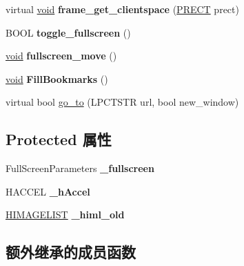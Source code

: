 \begin{DoxyCompactItemize}
\item 
\mbox{\label{struct_main_frame_base_ab834062a8833a75cfe588cfc1566be9c}} 
virtual \hyperlink{interfacevoid}{void} {\bfseries frame\+\_\+get\+\_\+clientspace} (\hyperlink{structtag_r_e_c_t}{P\+R\+E\+CT} prect)
\item 
\mbox{\label{struct_main_frame_base_a78f400c9cca3fd0154be1b86bad01a17}} 
B\+O\+OL {\bfseries toggle\+\_\+fullscreen} ()
\item 
\mbox{\label{struct_main_frame_base_ae3d3500990cb5cb247cad6bcebc5f6f6}} 
\hyperlink{interfacevoid}{void} {\bfseries fullscreen\+\_\+move} ()
\item 
\mbox{\label{struct_main_frame_base_ae018b3ad2dbb4aca642ba86b653b505f}} 
\hyperlink{interfacevoid}{void} {\bfseries Fill\+Bookmarks} ()
\item 
virtual bool \hyperlink{struct_main_frame_base_acda2cb5fd6551d867dbce53b86c1b01f}{go\+\_\+to} (L\+P\+C\+T\+S\+TR url, bool new\+\_\+window)
\end{DoxyCompactItemize}
\subsection*{Protected 属性}
\begin{DoxyCompactItemize}
\item 
\mbox{\label{struct_main_frame_base_a6a6aced201537edca7ba838f110bb46f}} 
Full\+Screen\+Parameters {\bfseries \+\_\+fullscreen}
\item 
\mbox{\label{struct_main_frame_base_ac6f73aaf4333664b18937cbf0fcf5c97}} 
H\+A\+C\+C\+EL {\bfseries \+\_\+h\+Accel}
\item 
\mbox{\label{struct_main_frame_base_a74cbffc2bd0d6e65837aea0737e88eb4}} 
\hyperlink{struct___i_m_a_g_e_l_i_s_t}{H\+I\+M\+A\+G\+E\+L\+I\+ST} {\bfseries \+\_\+himl\+\_\+old}
\end{DoxyCompactItemize}
\subsection*{额外继承的成员函数}


